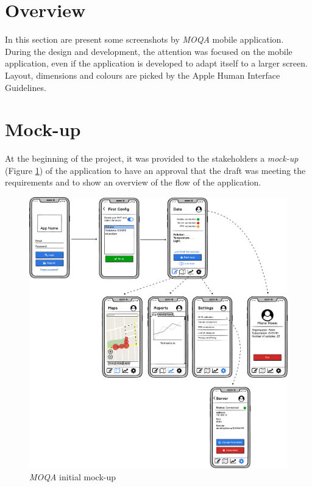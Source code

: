 \section{Overview}
In this section are present some screenshots by \textit{MOQA} mobile application.\\
During the design and development, the attention was focused on the mobile application, even if the application is developed to adapt itself to a larger screen. Layout, dimensions and colours are picked by the Apple Human Interface Guidelines.\\

\section{Mock-up}
At the beginning of the project, it was provided to the stakeholders a \textit{mock-up} (Figure \ref{img:initialWireframe}) of the application to have an approval that the draft was meeting the requirements and to show an overview of the flow of the application.

\begin{figure}[H]
\begin{center}
  \includegraphics[width=\textwidth]{img/initialWireframe.png}
  \hspace{0.05\linewidth}
  \centering
  \caption{\textit{MOQA} initial mock-up}
  \label{img:initialWireframe}
\end{center}
\end{figure}
\clearpage


